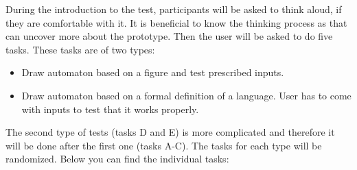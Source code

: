 During the introduction to the test, participants will be asked to think aloud, if they are comfortable with it. It is beneficial to know the thinking process as that can uncover more about the prototype. Then the user will be asked to do five tasks. These tasks are of two types:
\begin{itemize}
    \item Draw automaton based on a figure and test prescribed inputs.
    \item Draw automaton based on a formal definition of a language. User has to come with inputs to test that it works properly.
\end{itemize}

The second type of tests (tasks D and E) is more complicated and therefore it will be done after the first one (tasks A-C). The tasks for each type will be randomized. Below you can find the individual tasks:


